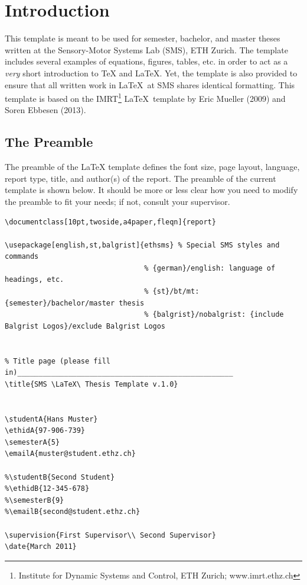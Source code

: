 
\chapter{Introduction}\label{sec:introduction}
This template is meant to be used for semester, bachelor, and master theses written at the Sensory-Motor Systems Lab (SMS), ETH Zurich. The template includes several examples of equations, figures, tables, etc. in order to act as a {\it very} short introduction to \TeX\! and \LaTeX. Yet, the template is also provided to ensure that all written work in \LaTeX ~at SMS shares identical formatting.
This template is based on the IMRT\footnote{Institute for Dynamic Systems and Control, ETH Zurich; www.imrt.ethz.ch} \LaTeX ~template by Eric Mueller (2009) and Soren Ebbesen (2013).

\section{The Preamble}\label{sec:preamble}
The preamble of the \LaTeX\! template defines the font size, page layout, language, report type, title, and author(s) of the report. The preamble of the current template is shown below. It should be more or less clear how you need to modify the preamble to fit your needs; if not, consult your supervisor.
\begin{verbatim}
\documentclass[10pt,twoside,a4paper,fleqn]{report}

\usepackage[english,st,balgrist]{ethsms} % Special SMS styles and commands      	
								 % {german}/english: language of headings, etc.
								 % {st}/bt/mt: {semester}/bachelor/master thesis
								 % {balgrist}/nobalgrist: {include Balgrist Logos}/exclude Balgrist Logos
							

% Title page (please fill in)___________________________________________________
\title{SMS \LaTeX\ Thesis Template v.1.0}


\studentA{Hans Muster}
\ethidA{97-906-739}
\semesterA{5}
\emailA{muster@student.ethz.ch}

%\studentB{Second Student}
%\ethidB{12-345-678}
%\semesterB{9}
%\emailB{second@student.ethz.ch}

\supervision{First Supervisor\\ Second Supervisor}
\date{March 2011}
 \end{verbatim}

